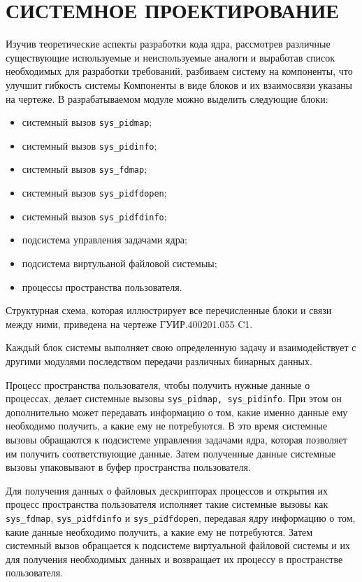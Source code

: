 \section{СИСТЕМНОЕ ПРОЕКТИРОВАНИЕ}
\label{sec:sys}

Изучив теоретические аспекты разработки кода ядра, рассмотрев различные
существующие используемые и неиспользуемые аналоги и выработав список
необходимых для разработки требований, разбиваем систему на компоненты, что
улучшит гибкость системы
Компоненты в виде блоков и их взаимосвязи указаны на чертеже.
В разрабатываемом модуле можно выделить следующие блоки:
\begin{itemize}
\item системный вызов \texttt{sys\_pidmap};
\item системный вызов \texttt{sys\_pidinfo};
\item системный вызов \texttt{sys\_fdmap};
\item системный вызов \texttt{sys\_pidfdopen};
\item системный вызов \texttt{sys\_pidfdinfo};
\item подсистема управления задачами ядра;
\item подсистема виртульаной файловой системыы;
\item процессы пространства пользователя.
\end{itemize}

Структурная схема, которая иллюстрирует все перечисленные блоки и связи
между ними, приведена на чертеже ГУИР.400201.055 C1.

Каждый блок системы выполняет свою определенную задачу и взаимодействует с
другими модулями последством передачи различных бинарных данных. 

Процесс пространства пользователя, чтобы получить нужные данные о процессах,
делает системные вызовы \texttt{sys\_pidmap, sys\_pidinfo}.
При этом он дополнительно может передавать информацию о том, какие именно данные
ему необходимо получить, а какие ему не потребуются.
В это время системные вызовы обращаются к подсистеме управления задачами ядра,
которая позволяет им получить соответствующие данные. Затем полученные данные
системные вызовы упаковывают в буфер пространства пользователя. 

Для получения данных о файловых дескрипторах процессов и открытия их процесс
пространства пользователя исполняет такие системные вызовы как
\texttt{sys\_fdmap}, \texttt{sys\_pidfdinfo} и \texttt{sys\_pidfdopen},
передавая ядру информацию о том, какие данные необходимо получить, а какие ему
не потребуются. Затем системный вызов обращается к подсистеме виртуальной
файловой системы и их для получения необходимых данных и возвращает их процессу
в пространстве пользователя.

